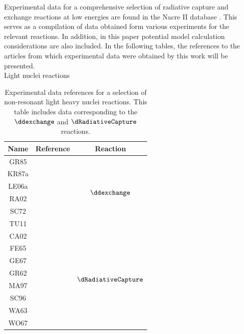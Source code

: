 \documentclass[openany]{book}
\begin{document}
Experimental data for a comprehensive selection of radiative capture and exchange reactions at low energies are found in the Nacre II database \cite{xu_takahashi_goriely_arnould_ohta_utsunomiya_2013}. This serves as a compilation of data obtained form various experiments for the relevant reactions. In addition, in this paper potential model calculation considerations are also included. In the following tables, the references to the articles from which experimental data were obtained by this work will be presented. \\

Light nuclei reactions

\begin{table}[H]
	\centering
	\begin{tabular}{|c|c|c|}
		\hline
		Name & Reference & Reaction \\ \hline
		GR85 &  \cite{greife_gorris_junker_rolfs_zahnow_1995}  &   \multirow{6}{*}{$\ddexchange$}       \\ \cline{1-2}
		KR87a &  \cite{krauss_becker_trautvetter_rolfs_brand_1987}  &         \\ \cline{1-2}
		LE06a &     \cite{leonard_karwowski_brune_fisher_ludwig_2006}  &     \\ \cline{1-2}
		RA02 &    \cite{raiola_migliardi_gyurky_aliotta_formicola_bonetti_broggini_campajola_corvisiero_costantini_et_2002}      & \\ \cline{1-2}
		SC72 &    \cite{schulte_cosack_obst_weil_1972} & \\ \cline{1-2}
		TU11 &  \cite{tumino_spitaleri_mukhamedzhanov_typel_aliotta_burjan_delsanto_kiss_kroha_hons_et_2011} & \\ \hline
		CA02 &   \cite{casella_costantini_lemut_limata_bonetti_broggini_campajola_corvisiero_cruz_donofrio_et_2002}  &   \multirow{8}{*}{$\dRadiativeCapture$}         \\ \cline{1-2}
		FE65 &  \cite{fetisov_gorbunov_varfolomeev_1965} &         \\ \cline{1-2}
		GE67 &  \cite{geller_muirhead_cohen_1967} &     \\ \cline{1-2}
		GR62 &  \cite{griffiths_larson_robertson_1962} &     \\ \cline{1-2}
		MA97 &    \cite{ma_karwowski_brune_ayer_black_blackmon_ludwig_viviani_kievsky_schiavilla_et_1997} &  \\ \cline{1-2}
		SC96  &   \cite{schmid_viviani_rice_chasteler_godwin_kiang_kiang_kievsky_laymon_prior_et_1996} & \\ \cline{1-2}
		WA63 &   \cite{warren_erdman_robertson_axen_macdonald_1963} & \\ \cline{1-2}
		WO67  &   \cite{wolfli_bosch_lang_muller_marmier_1967} & \\ \hline
	\end{tabular}
	\caption[References $\ddexchange$ and $\dRadiativeCapture$ experimental data]{Experimental data references for a selection of non-resonant light heavy nuclei reactions. This table includes data corresponding to the $\ddexchange$ and $\dRadiativeCapture$ reactions.}
	\label{table:light_nonResonant}
\end{table}
\end{document}
